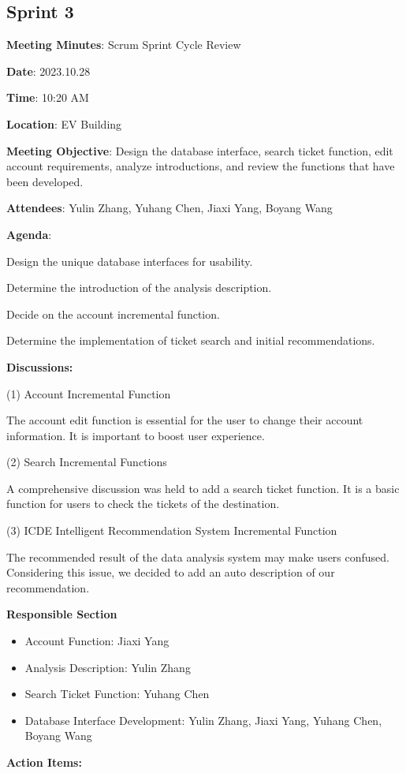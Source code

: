 \documentclass[conference]{IEEEtran}
\begin{document}
\subsection*{Sprint 3}

\textbf{Meeting Minutes}: Scrum Sprint Cycle Review

\textbf{Date}: 2023.10.28

\textbf{Time}: 10:20 AM

\textbf{Location}: EV Building

\textbf{Meeting Objective}: Design the database interface, search ticket function, edit account requirements, analyze introductions, and review the functions that have been developed.

\textbf{Attendees}: Yulin Zhang, Yuhang Chen, Jiaxi Yang, Boyang Wang

\textbf{Agenda}:

Design the unique database interfaces for usability.

Determine the introduction of the analysis description.

Decide on the account incremental function.

Determine the implementation of ticket search and initial recommendations.

\textbf{Discussions:}

(1) Account Incremental Function

The account edit function is essential for the user to change their account information. It is important to boost user experience. 

(2) Search Incremental Functions

A comprehensive discussion was held to add a search ticket function. It is a basic function for users to check the tickets of the destination.

(3) ICDE Intelligent Recommendation System Incremental Function

The recommended result of the data analysis system may make users confused. Considering this issue, we decided to add an auto description of our recommendation.

\textbf{Responsible Section}
\begin{itemize}
\item Account Function: Jiaxi Yang
\item Analysis Description: Yulin Zhang
\item Search Ticket Function: Yuhang Chen
\item Database Interface Development: Yulin Zhang, Jiaxi Yang, Yuhang Chen, Boyang Wang
\end{itemize}
\textbf{Action Items:}
\end{document}
